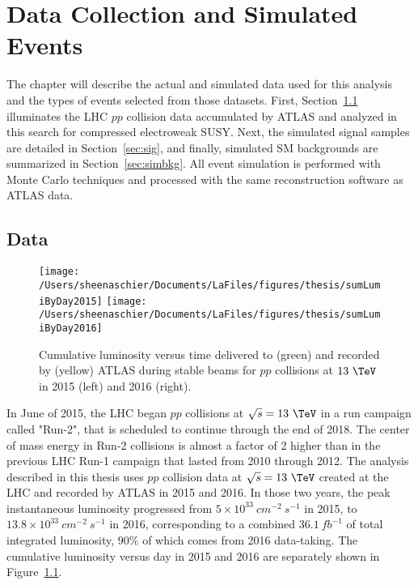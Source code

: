 \chapter{Data Collection and Simulated Events}
\label{sec:data}
The chapter will describe the actual and simulated data used for this analysis and the types of events selected from those datasets.  First, Section~\ref{sec:data} illuminates the LHC $pp$ collision data accumulated by ATLAS and analyzed in this search for compressed electroweak SUSY.  Next, the simulated signal samples are detailed in Section~\ref{sec:sig}, and finally, simulated SM backgrounds are summarized in Section~\ref{sec:simbkg}.  All event simulation is performed with Monte Carlo techniques and processed with the same reconstruction software as ATLAS data.  
 
\section{Data}
\label{sec:data}

 \begin{figure}[tbp]
 \texttt{[image: /Users/sheenaschier/Documents/LaFiles/figures/thesis/sumLumiByDay2015]}
 \texttt{[image: /Users/sheenaschier/Documents/LaFiles/figures/thesis/sumLumiByDay2016]}\\
 \caption{Cumulative luminosity versus time delivered to (green) and recorded by (yellow) ATLAS during stable beams for $pp$ collisions at $13~\TeV$ in 2015 (left) and 2016 (right).}
 \label{fig:lumi}
 \end{figure}
In June of 2015, the LHC began $pp$ collisions at $\sqrt{s}=13~\TeV$ in a run campaign called "Run-2", that is scheduled to continue through the end of 2018.  The center of mass energy in Run-2 collisions is almost a factor of 2 higher than in the previous LHC Run-1 campaign that lasted from 2010 through 2012. The analysis described in this thesis uses $pp$ collision data at $\sqrt{s}=13~\TeV$ created at the LHC and recorded by ATLAS in 2015 and 2016.  In those two years, the peak instantaneous luminosity progressed from $5\times10^{33}~cm^{-2}~s^{-1}$ in 2015, to $13.8\times10^{33}~cm^{-2}~s^{-1}$ in 2016, corresponding to a combined $36.1~fb^{-1}$ of total integrated luminosity, $90\%$ of which comes from 2016 data-taking.  The cumulative luminosity versus day in 2015 and 2016 are separately shown in Figure~\ref{fig:lumi}.

